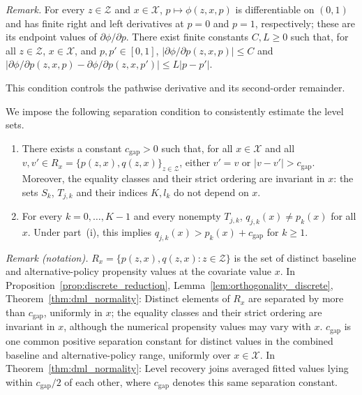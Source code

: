\noindent\textit{Remark.} For every $z\in\mathcal Z$ and $x\in\mathcal X$, $p\mapsto\phi(z,x,p)$ is differentiable on $(0,1)$ and has finite right and left derivatives at $p=0$ and $p=1$, respectively; these are its endpoint values of $\partial\phi/\partial p$. There exist finite constants $C,L\geqslant0$ such that, for all $z\in\mathcal Z$, $x\in\mathcal X$, and $p,p'\in[0,1]$, $|\partial\phi/\partial p(z,x,p)|\leqslant C$ and $|\partial\phi/\partial p(z,x,p)-\partial\phi/\partial p(z,x,p')|\leqslant L|p-p'|$.

This condition controls the pathwise derivative and its second-order remainder.

We impose the following separation condition to consistently estimate the level sets.

\begin{assumption}\label{asp:prop_gap}
    \begin{enumerate}[label=(\roman*)]
        \item There exists a constant $c_{\text{gap}} > 0$ such that, for all $x \in \mathcal{X}$ and all $v,v' \in R_x = \{p(z,x),q(z,x)\}_{z \in \mathcal{Z}}$, either $v'=v$ or $|v-v'|>c_{\text{gap}}$. Moreover, the equality classes and their strict ordering are invariant in $x$: the sets $S_k$, $T_{j,k}$ and their indices $K,l_k$ do not depend on $x$.
        \item For every $k=0,\ldots,K-1$ and every nonempty $T_{j,k}$, $q_{j,k}(x)\neq p_k(x)$ for all $x$. Under part~\textup{(i)}, this implies $q_{j,k}(x)>p_k(x)+c_{\text{gap}}$ for $k\geqslant1$.
    \end{enumerate}
\end{assumption}

\noindent\textit{Remark (notation).} $R_x=\{p(z,x),q(z,x):z\in\mathcal Z\}$ is the set of distinct baseline and alternative-policy propensity values at the covariate value $x$. In Proposition~\ref{prop:discrete_reduction}, Lemma~\ref{lem:orthogonality_discrete}, Theorem~\ref{thm:dml_normality}: Distinct elements of $R_x$ are separated by more than $c_{\text{gap}}$, uniformly in $x$; the equality classes and their strict ordering are invariant in $x$, although the numerical propensity values may vary with $x$. $c_{\text{gap}}$ is one common positive separation constant for distinct values in the combined baseline and alternative-policy range, uniformly over $x\in\mathcal X$. In Theorem~\ref{thm:dml_normality}: Level recovery joins averaged fitted values lying within $c_{\mathrm{gap}}/2$ of each other, where $c_{\mathrm{gap}}$ denotes this same separation constant.


